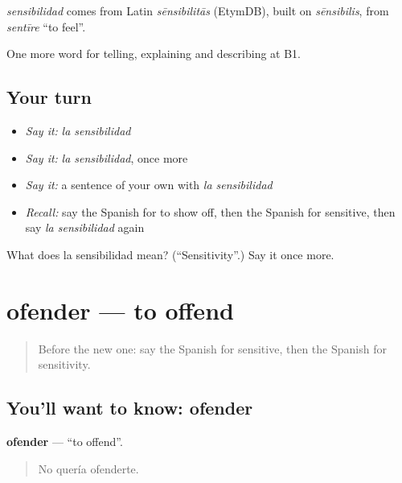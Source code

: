 \begin{cousinweb}
\emph{sensibilidad} comes from Latin \emph{sēnsibilitās} (EtymDB), built on \emph{sēnsibilis}, from \emph{sentīre} \textquotedblleft{}to feel\textquotedblright{}.
\end{cousinweb}

\begin{grammarlens}[title={What you've built}]
One more word for telling, explaining and describing at B1.
\end{grammarlens}

\subsection*{Your turn}
\begin{itemize}
\raggedright
  \item \emph{Say it:} \emph{la sensibilidad}
  \item \emph{Say it:} \emph{la sensibilidad}, once more
  \item \emph{Say it:} a sentence of your own with \emph{la sensibilidad}
  \item \emph{Recall:} say the Spanish for to show off, then the Spanish for sensitive, then say \emph{la sensibilidad} again
\end{itemize}

\begin{tcolorbox}[breakable,colback=teal!4,colframe=teal!35!black,title={Before you move on}]
What does la sensibilidad mean? (\textquotedblleft{}Sensitivity\textquotedblright{}.) Say it once more.
\end{tcolorbox}
\section[ofender]{ofender — to offend}

\label{lesson:ES-C727-ofender}



\begin{quote}
Before the new one: say the Spanish for sensitive, then the Spanish for sensitivity.
\end{quote}

\subsection*{You'll want to know: ofender}
\textbf{ofender} — \textquotedblleft{}to offend\textquotedblright{}.

\begin{quote}
No quería ofenderte.
\end{quote}

